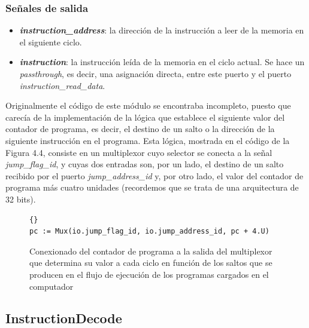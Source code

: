 \subsubsection{Señales de salida}

\begin{itemize}
  \item \textbf{\textit{instruction\_address}}: la dirección de la instrucción a leer de la memoria en el siguiente ciclo.
  \vspace{-0.2cm}
  \item \textbf{\textit{instruction}}: la instrucción leída de la memoria en el ciclo actual. Se hace un \textit{passthrough}, es decir, una asignación directa, entre este puerto y el puerto \textit{instruction\_read\_data}.
\end{itemize}

Originalmente el código de este módulo se encontraba incompleto, puesto que carecía de la implementación de la lógica que establece el siguiente valor del contador de programa, es decir, el destino de un salto o la dirección de la siguiente instrucción en el programa. Esta lógica, mostrada en el código de la Figura 4.4, consiste en un multiplexor cuyo selector se conecta a la señal \textit{jump\_flag\_id}, y cuyas dos entradas son, por un lado, el destino de un salto recibido por el puerto \textit{jump\_address\_id} y, por otro lado, el valor del contador de programa más cuatro unidades (recordemos que se trata de una arquitectura de 32 bits).

\vspace{+0.8cm}
\begin{figure}[h]
\centering
\begin{minipage}{0.9\linewidth}
\begin{lstlisting}[style=scalaStyle]{}
pc := Mux(io.jump_flag_id, io.jump_address_id, pc + 4.U)
\end{lstlisting}
\caption{Conexionado del contador de programa a la salida del multiplexor que determina su valor a cada ciclo en función de los saltos que se producen en el flujo de ejecución de los programas cargados en el computador}
\end{minipage}
\end{figure}
\vspace{+0.2cm}

\subsection{InstructionDecode}

